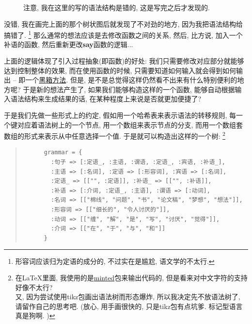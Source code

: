 \begin{example}
  \begin{figure}[h]
    \centering
    \caption{注意, 我在这里的写的语法结构是错的, 这是写完之后才发现的. }
  \end{figure}
  
  没错, 我在画完上面的那个树状图后就发现了不对劲的地方, 因为我把语法结构给搞错了. \footnote{形容词应该归为定语的成分的, 不过实在是尴尬, 语文学的不太行. } 那么通常的想法应该是去修改函数之间的关系, 然后, 比方说, 加入一个补语的函数, 然后重新更改\textbf{say}函数的逻辑... 

  上面的逻辑体现了引入过程抽象(即函数)的好处: 我们只需要修改对应部分就能够达到控制整体的效果, 而在使用函数的时候, 只需要知道如何输入就会得到如何输出 -- 即一个\href{https://en.wikipedia.org/wiki/Black-box_testing}{黑箱方法}. 但是, 是不是总觉得这样仍然看不出来有什么特别便利的地方呢? 于是新的想法产生了, 如果我们能够构造这样的一个函数, 能够自动根据输入语法结构来生成结果的话, 在某种程度上来说是否就更加便捷了? 

  于是我们先做一些形式上的约定, 假如用一个哈希表来表示语法的转移规则, 每一个键对应着语法树上的一个节点, 用一个数组来表示节点的分支, 而用一个数组套数组的形式来表示从中任意选择一个值. 于是就可以构造出这样的一个树: \footnote{在\LaTeX 里面, 我使用的是\href{https://ctan.org/pkg/minted}{minted}包来输出代码的, 但是看来对中文字符的支持好像不太行? \\ 又, 因为尝试使用tikz包画出语法树而形态爆炸, 所以我决定先不放语法树了, 请留作自己的思考吧. (放心, 用手画很快的, 只是tikz包有点坑爹. 标记型语言真是狗啊. )}

  \begin{quotation}
    \begin{verbatim}
      grammar = {
        :句子 => [:定语_, :主语, :谓语, :定语_, :宾语, :补语_],
        :主语 => [:名词], :定语 => [:形容词], :宾语 => [:名词],
        :定语_ => [["", :定语]], :补语_ => [["", :补语]], 
        :补语 => [:介词, :定语_, :主语], :谓语 => [:动词],
        :名词 => [["棉线", "问题", "书", "论文稿", "梦想", "想法"]], 
        :形容词 => [["细长的", "令人讨厌的"]], 
        :动词 => [["缠", "解", "是", "写", "讨厌", "觉得"]],
        :介词 => [["在", "于", "与", "和"]]
      }
    \end{verbatim}
  \end{quotation}
  

\end{example}
